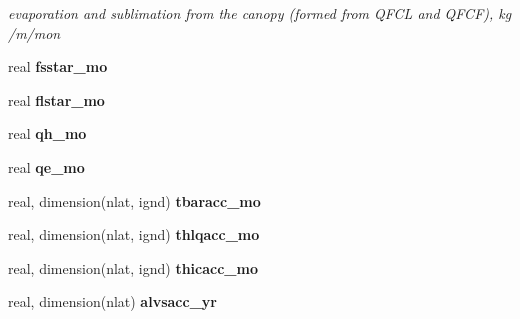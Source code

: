 \begin{DoxyCompactItemize}
\begin{DoxyCompactList}\small\item\em evaporation and sublimation from the canopy (formed from Q\+F\+C\+L and Q\+F\+C\+F), kg /m/mon \end{DoxyCompactList}\item 
\hypertarget{structctem__statevars_1_1class__moyr__output_a778525103dcfd23a35e157482c7b4621}{}real {\bfseries fsstar\+\_\+mo}\label{structctem__statevars_1_1class__moyr__output_a778525103dcfd23a35e157482c7b4621}

\item 
\hypertarget{structctem__statevars_1_1class__moyr__output_adf85805abf59dcc217a1d7094fbbb5b1}{}real {\bfseries flstar\+\_\+mo}\label{structctem__statevars_1_1class__moyr__output_adf85805abf59dcc217a1d7094fbbb5b1}

\item 
\hypertarget{structctem__statevars_1_1class__moyr__output_ae2c30cee09903b5d41248e1febf1eb17}{}real {\bfseries qh\+\_\+mo}\label{structctem__statevars_1_1class__moyr__output_ae2c30cee09903b5d41248e1febf1eb17}

\item 
\hypertarget{structctem__statevars_1_1class__moyr__output_a73a2b36ed0b57abc37d444b6a7585d80}{}real {\bfseries qe\+\_\+mo}\label{structctem__statevars_1_1class__moyr__output_a73a2b36ed0b57abc37d444b6a7585d80}

\item 
\hypertarget{structctem__statevars_1_1class__moyr__output_a43c4161796ed635a0ef204cf6bcc9ad0}{}real, dimension(nlat, ignd) {\bfseries tbaracc\+\_\+mo}\label{structctem__statevars_1_1class__moyr__output_a43c4161796ed635a0ef204cf6bcc9ad0}

\item 
\hypertarget{structctem__statevars_1_1class__moyr__output_ac21020737da97d8851b55d2bf3b4ea3b}{}real, dimension(nlat, ignd) {\bfseries thlqacc\+\_\+mo}\label{structctem__statevars_1_1class__moyr__output_ac21020737da97d8851b55d2bf3b4ea3b}

\item 
\hypertarget{structctem__statevars_1_1class__moyr__output_ae79828ac59703affa31d8ae1ebbc03c7}{}real, dimension(nlat, ignd) {\bfseries thicacc\+\_\+mo}\label{structctem__statevars_1_1class__moyr__output_ae79828ac59703affa31d8ae1ebbc03c7}

\item 
\hypertarget{structctem__statevars_1_1class__moyr__output_aef7bd3ed1fac93381b37edeaafb953b4}{}real, dimension(nlat) {\bfseries alvsacc\+\_\+yr}\label{structctem__statevars_1_1class__moyr__output_aef7bd3ed1fac93381b37edeaafb953b4}


\end{DoxyCompactItemize}
